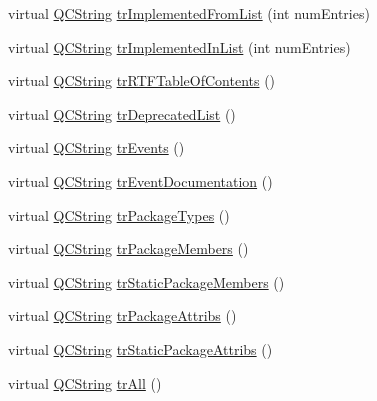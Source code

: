 \begin{DoxyCompactItemize}
\item 
virtual \mbox{\hyperlink{class_q_c_string}{Q\+C\+String}} \mbox{\hyperlink{class_translator_portuguese_abf92ebb4a3d3fece734b9224b91f199b}{tr\+Implemented\+From\+List}} (int num\+Entries)
\item 
virtual \mbox{\hyperlink{class_q_c_string}{Q\+C\+String}} \mbox{\hyperlink{class_translator_portuguese_a0ede69fe6802ec86184ba3e2c259e94d}{tr\+Implemented\+In\+List}} (int num\+Entries)
\item 
virtual \mbox{\hyperlink{class_q_c_string}{Q\+C\+String}} \mbox{\hyperlink{class_translator_portuguese_a29311f67bfde32cffc992895b6f7ae0f}{tr\+R\+T\+F\+Table\+Of\+Contents}} ()
\item 
virtual \mbox{\hyperlink{class_q_c_string}{Q\+C\+String}} \mbox{\hyperlink{class_translator_portuguese_a1a1007b64d337d6674e1c5729c49a950}{tr\+Deprecated\+List}} ()
\item 
virtual \mbox{\hyperlink{class_q_c_string}{Q\+C\+String}} \mbox{\hyperlink{class_translator_portuguese_a3d881a57ecc9b039ad91d4f811082e07}{tr\+Events}} ()
\item 
virtual \mbox{\hyperlink{class_q_c_string}{Q\+C\+String}} \mbox{\hyperlink{class_translator_portuguese_a74a3dcbae4a9f56c143ad597c5eb3295}{tr\+Event\+Documentation}} ()
\item 
virtual \mbox{\hyperlink{class_q_c_string}{Q\+C\+String}} \mbox{\hyperlink{class_translator_portuguese_af7256682a5025c429603f8797c6b69a3}{tr\+Package\+Types}} ()
\item 
virtual \mbox{\hyperlink{class_q_c_string}{Q\+C\+String}} \mbox{\hyperlink{class_translator_portuguese_ae9c591a79f87322df06489b69c2eae7f}{tr\+Package\+Members}} ()
\item 
virtual \mbox{\hyperlink{class_q_c_string}{Q\+C\+String}} \mbox{\hyperlink{class_translator_portuguese_a4aebc54ec4c1ab1e8a02d55a801bc770}{tr\+Static\+Package\+Members}} ()
\item 
virtual \mbox{\hyperlink{class_q_c_string}{Q\+C\+String}} \mbox{\hyperlink{class_translator_portuguese_a9844834ead1d1a1aff83c3f6eda97c42}{tr\+Package\+Attribs}} ()
\item 
virtual \mbox{\hyperlink{class_q_c_string}{Q\+C\+String}} \mbox{\hyperlink{class_translator_portuguese_a6e55746ec13ec111016463fa1ea8a294}{tr\+Static\+Package\+Attribs}} ()
\item 
virtual \mbox{\hyperlink{class_q_c_string}{Q\+C\+String}} \mbox{\hyperlink{class_translator_portuguese_aff6802cfce12a2452d0ba2cfa19b2295}{tr\+All}} ()
\item 

\end{DoxyCompactItemize}
